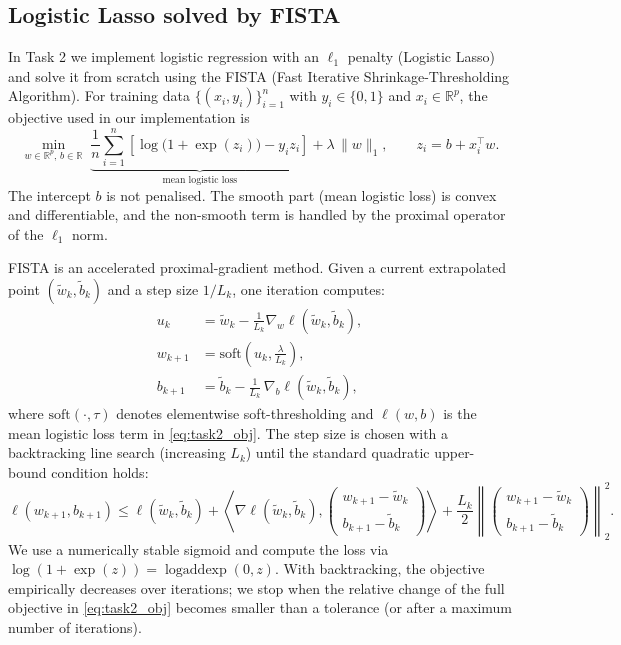 \documentclass{article}
\begin{document}
\subsection{Logistic Lasso solved by FISTA}
In Task 2 we implement logistic regression with an $\ell_1$ penalty (Logistic Lasso) and solve it from scratch using the FISTA (Fast Iterative Shrinkage-Thresholding Algorithm). For training data $\{(x_i,y_i)\}_{i=1}^n$ with $y_i\in\{0,1\}$ and $x_i\in\mathbb{R}^p$, the objective used in our implementation is
\begin{equation}
\label{eq:task2_obj}
\min_{w\in\mathbb{R}^p,\,b\in\mathbb{R}} \; \underbrace{\frac{1}{n}\sum_{i=1}^n\left[\log\bigl(1+\exp(z_i)\bigr)-y_i z_i\right]}_{\text{mean logistic loss}} + \lambda\,\lVert w\rVert_1,\qquad z_i=b+x_i^\top w.
\end{equation}
The intercept $b$ is not penalised. The smooth part (mean logistic loss) is convex and differentiable, and the non-smooth term is handled by the proximal operator of the $\ell_1$ norm.

FISTA is an accelerated proximal-gradient method. Given a current extrapolated point $(\tilde w_k,\tilde b_k)$ and a step size $1/L_k$, one iteration computes:
\begin{align}
u_k &= \tilde w_k - \frac{1}{L_k}\nabla_w\ell(\tilde w_k,\tilde b_k),\\
w_{k+1} &= \mathrm{soft}\!\left(u_k,\frac{\lambda}{L_k}\right),\\
b_{k+1} &= \tilde b_k - \frac{1}{L_k}\,\nabla_b\ell(\tilde w_k,\tilde b_k),
\end{align}
where $\mathrm{soft}(\cdot,\tau)$ denotes elementwise soft-thresholding and $\ell(w,b)$ is the mean logistic loss term in \eqref{eq:task2_obj}. The step size is chosen with a backtracking line search (increasing $L_k$) until the standard quadratic upper-bound condition holds:
\begin{equation}
\label{eq:task2_backtracking}
\ell(w_{k+1},b_{k+1}) \le \ell(\tilde w_k,\tilde b_k) + \left\langle \nabla\ell(\tilde w_k,\tilde b_k),\begin{pmatrix} w_{k+1}-\tilde w_k \\ b_{k+1}-\tilde b_k \end{pmatrix}\right\rangle + \frac{L_k}{2}\left\lVert\begin{pmatrix} w_{k+1}-\tilde w_k \\ b_{k+1}-\tilde b_k \end{pmatrix}\right\rVert_2^2.
\end{equation}
We use a numerically stable sigmoid and compute the loss via $\log(1+\exp(z))=\operatorname{logaddexp}(0,z)$. With backtracking, the objective empirically decreases over iterations; we stop when the relative change of the full objective in \eqref{eq:task2_obj} becomes smaller than a tolerance (or after a maximum number of iterations).
\end{document}
